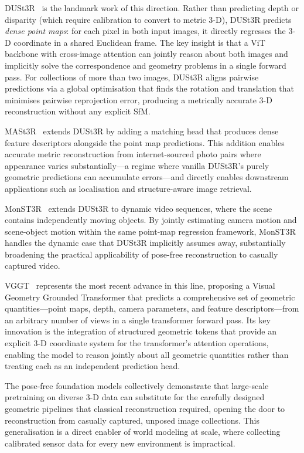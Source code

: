 DUSt3R~\citep{wang2024dust3r} is the landmark work of this direction.
Rather than predicting depth or disparity (which require calibration to convert
to metric 3-D), DUSt3R predicts \emph{dense point maps}: for each pixel in
both input images, it directly regresses the 3-D coordinate in a shared
Euclidean frame.
The key insight is that a ViT backbone with cross-image attention can jointly
reason about both images and implicitly solve the correspondence and geometry
problems in a single forward pass.
For collections of more than two images, DUSt3R aligns pairwise predictions
via a global optimisation that finds the rotation and translation that minimises
pairwise reprojection error, producing a metrically accurate 3-D reconstruction
without any explicit SfM.

MASt3R~\citep{leroy2024mast3r} extends DUSt3R by adding a matching head that
produces dense feature descriptors alongside the point map predictions.
This addition enables accurate metric reconstruction from internet-sourced
photo pairs where appearance varies substantially---a regime where vanilla
DUSt3R's purely geometric predictions can accumulate errors---and directly
enables downstream applications such as localisation and structure-aware
image retrieval.

MonST3R~\citep{zhang2024monst3r} extends DUSt3R to dynamic video sequences,
where the scene contains independently moving objects.
By jointly estimating camera motion and scene-object motion within the same
point-map regression framework, MonST3R handles the dynamic case that DUSt3R
implicitly assumes away, substantially broadening the practical applicability
of pose-free reconstruction to casually captured video.

VGGT~\citep{wang2025vggt} represents the most recent advance in this line,
proposing a Visual Geometry Grounded Transformer that predicts a comprehensive
set of geometric quantities---point maps, depth, camera parameters, and feature
descriptors---from an arbitrary number of views in a single transformer forward
pass.
Its key innovation is the integration of structured geometric tokens that
provide an explicit 3-D coordinate system for the transformer's attention
operations, enabling the model to reason jointly about all geometric quantities
rather than treating each as an independent prediction head.

The pose-free foundation models collectively demonstrate that large-scale
pretraining on diverse 3-D data can substitute for the carefully designed
geometric pipelines that classical reconstruction required, opening the door
to reconstruction from casually captured, unposed image collections.
This generalisation is a direct enabler of world modeling at scale, where
collecting calibrated sensor data for every new environment is impractical.

